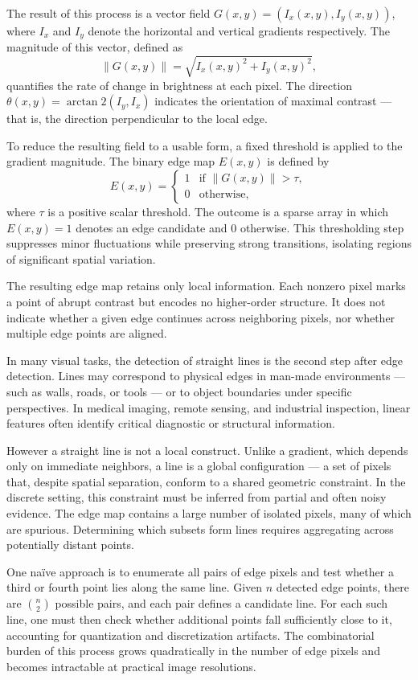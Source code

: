 The result of this process is a vector field $G(x, y) = (I_x(x, y), I_y(x, y))$, where $I_x$ and $I_y$ denote the horizontal and vertical gradients respectively. The magnitude of this vector, defined as
\[
\|G(x, y)\| = \sqrt{I_x(x, y)^2 + I_y(x, y)^2},
\]
quantifies the rate of change in brightness at each pixel. The direction $\theta(x, y) = \arctan2(I_y, I_x)$ indicates the orientation of maximal contrast — that is, the direction perpendicular to the local edge.

To reduce the resulting field to a usable form, a fixed threshold is applied to the gradient magnitude. The binary edge map $E(x, y)$ is defined by
\[
E(x, y) =
\begin{cases}
1 & \text{if } \|G(x, y)\| > \tau, \\
0 & \text{otherwise},
\end{cases}
\]
where $\tau$ is a positive scalar threshold. The outcome is a sparse array in which $E(x, y) = 1$ denotes an edge candidate and $0$ otherwise. This thresholding step suppresses minor fluctuations while preserving strong transitions, isolating regions of significant spatial variation.

The resulting edge map retains only local information. Each nonzero pixel marks a point of abrupt contrast but encodes no higher-order structure. It does not indicate whether a given edge continues across neighboring pixels, nor whether multiple edge points are aligned.

In many visual tasks, the detection of straight lines is the second step after edge detection. Lines may correspond to physical edges in man-made environments — such as walls, roads, or tools — or to object boundaries under specific perspectives. In medical imaging, remote sensing, and industrial inspection, linear features often identify critical diagnostic or structural information.

However a straight line is not a local construct. Unlike a gradient, which depends only on immediate neighbors, a line is a global configuration — a set of pixels that, despite spatial separation, conform to a shared geometric constraint. In the discrete setting, this constraint must be inferred from partial and often noisy evidence. The edge map contains a large number of isolated pixels, many of which are spurious. Determining which subsets form lines requires aggregating across potentially distant points.

One naïve approach is to enumerate all pairs of edge pixels and test whether a third or fourth point lies along the same line. Given $n$ detected edge points, there are $\binom{n}{2}$ possible pairs, and each pair defines a candidate line. For each such line, one must then check whether additional points fall sufficiently close to it, accounting for quantization and discretization artifacts. The combinatorial burden of this process grows quadratically in the number of edge pixels and becomes intractable at practical image resolutions.

